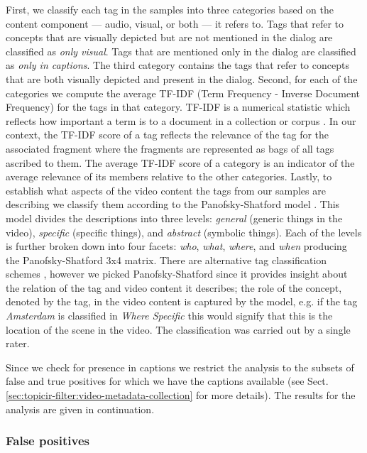 First, we classify each tag in the samples into three categories based on the content component --- audio, visual, or both --- it refers to. Tags that refer to concepts that are visually depicted but are not mentioned in the dialog are classified as \textit{only visual}. Tags that are mentioned only in the dialog are classified as \textit{only in captions}. The third category contains the tags that refer to concepts that are both visually depicted and present in the dialog. Second, for each of the categories we compute the average TF-IDF (Term Frequency - Inverse Document Frequency) for the tags in that category. TF-IDF is a numerical statistic which reflects how important a term is to a document in a collection or corpus \cite{tfidf1,tfidf2}. In our context, the TF-IDF score of a tag reflects the relevance of the tag for the associated fragment where the fragments are represented as bags of all tags ascribed to them.  The average TF-IDF score of a category is an indicator of the average relevance of its members relative to the other categories. Lastly, to establish what aspects of the video content the tags from our samples are describing we classify them according to the Panofsky-Shatford model \cite{Panofsky, Shatford}. This model divides the descriptions into three levels: \textit{general} (generic things in the video), \textit{specific} (specific things), and \textit{abstract} (symbolic things). Each of the levels is further broken down into four facets: \textit{who}, \textit{what}, \textit{where}, and \textit{when} producing the Panofsky-Shatford 3x4 matrix. There are alternative tag classification schemes \cite{Sigurbjornsson:2008:FTR:1367497.1367542,conf/mmm/HalveyJ10}, however we picked Panofsky-Shatford since it provides insight about the relation of the tag and video content it describes; the role of the concept, denoted by the tag, in the video content is captured by the model, e.g. if the tag \textit{Amsterdam} is classified in \textit{Where Specific} this would signify that this is the location of the scene in the video. The classification was carried out by a single rater. 

Since we check for presence in captions we restrict the analysis to the subsets of false and true positives for which we have the captions available (see Sect. \ref{sec:topicir-filter:video-metadata-collection} for more details). The results for the analysis are given in continuation.

\subsubsection{False positives}

